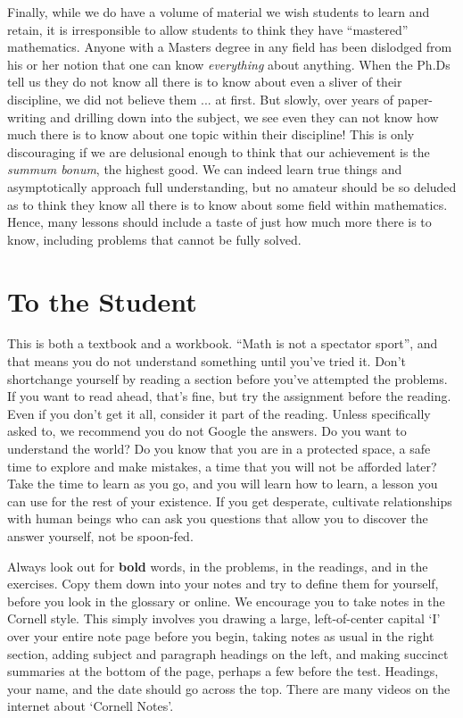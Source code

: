 Finally, while we do have a volume of material we wish students to learn and retain,
it is irresponsible to allow students to think they have ``mastered'' mathematics.  Anyone
with a Masters degree in any field has been dislodged from his or her notion that one
can know \emph{everything} about anything.  When the Ph.Ds tell us they do not know all
there is to know about even a sliver of their discipline, we did not believe them ... at first.
But slowly, over years of paper-writing and drilling down into the subject, we see even they
can not know how much there is to know about one topic within their discipline! This is
only discouraging if we are delusional enough to think that our achievement is the 
\textit{summum bonum}, the highest good.
We can indeed learn true things and asymptotically approach full understanding, but no
amateur should be so deluded as to think they know all there is to know about some
field within mathematics.  Hence, many lessons should include a taste of just how much
more there is to know, including problems that cannot be fully solved.


\section{To the Student}

This is both a textbook and a workbook.  ``Math is not a spectator sport'', and that means
you do not understand something until you've tried it.  Don't shortchange yourself by reading a
section before you've attempted the problems.  If you want to read ahead, that's fine, but
try the assignment before the reading.  Even if you don't get it all, consider it part of the reading.
Unless specifically asked to, we recommend you do not Google the answers.
Do you want to understand
the world?  Do you know that you are in a protected space, a safe time to explore and 
make mistakes, a time that you will not be afforded later?  Take the time to learn as you go, 
and you will learn how to learn, a lesson you can use for the rest of your existence.  If you get
desperate, cultivate relationships with human beings who can ask you questions that
allow you to discover the answer yourself, not be spoon-fed.

Always look out for \textbf{bold} words, in the problems, in the readings, and in the exercises.
Copy them down into your notes and try to define them for yourself, before you look in the
glossary or online. We
encourage you to take notes in the Cornell style.  This simply involves you drawing a large,
left-of-center capital `I' over your entire note page before you begin, taking notes as usual
in the right section, adding subject and paragraph headings on the left, and making
succinct summaries at the bottom of the page, perhaps a few before the test.  Headings,
your name, and the date should go across the top.
There are many videos on the internet about `Cornell Notes'.

